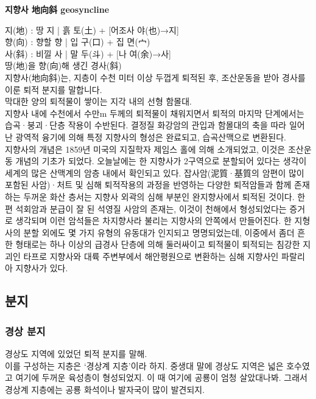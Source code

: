 \documentclass[12pt,a4paper]{book}
\begin{document}
				\textbf{지향사 地向斜 geosyncline}
				
				지(地) : 땅 지 | 흙 토(土) + [어조사 야(也)→지]\\
				향(向) : 향할 향 | 입 구(口) + 집 면(宀)\\
				사(斜) : 비낄 사 | 말 두(斗) + [나 여(余)→사]\\
				땅(地)을 향(向)해 생긴 경사(斜)\\
				지향사(地向斜)는, 
				지층이 수천 미터 이상 두껍게 퇴적된 후, 조산운동을 받아 경사를 이룬 퇴적 분지를 말합니다.\\				
막대한 양의 퇴적물이 쌓이는 지각 내의 선형 함몰대.\\
지향사 내에 수천에서 수만m 두께의 퇴적물이 채워지면서 퇴적의 마지막 단계에서는 습곡·붕괴·단층 작용이 수반된다. 결정질 화강암의 관입과 함몰대의 축을 따라 일어난 광역적 융기에 의해 특정 지향사의 형성은 완료되고, 습곡산맥으로 변환된다. \\
지향사의 개념은 1859년 미국의 지질학자 제임스 홀에 의해 소개되었고, 이것은 조산운동 개념의 기초가 되었다. 오늘날에는 한 지향사가 2구역으로 분할되어 있다는 생각이 세계의 많은 산맥계의 암층 내에서 확인되고 있다. 잡사암(泥質·基質의 암편이 많이 포함된 사암)·처트 및 심해 퇴적작용의 과정을 반영하는 다양한 퇴적암들과 함께 존재하는 두꺼운 화산 층서는 지향사 외곽의 심해 부분인 완지향사에서 퇴적된 것이다. 한편 석회암과 분급이 잘 된 석영질 사암의 존재는, 이것이 천해에서 형성되었다는 증거로 생각되며 이런 암석들은 차지향사라 불리는 지향사의 안쪽에서 만들어진다. 한 지형사의 분할 외에도 몇 가지 유형의 유동대가 인지되고 명명되었는데, 이중에서 좀더 흔한 형태로는 하나 이상의 급경사 단층에 의해 둘러싸이고 퇴적물이 퇴적되는 침강한 지괴인 타프로 지향사와 대륙 주변부에서 해안평원으로 변환하는 심해 지향사인 파랄리아 지향사가 있다.\\
				
				
		
		\subsection{분지}
		
			\subsubsection{경상 분지}
				경상도 지역에 있었던 퇴적 분지를 말해. \\
				이를 구성하는 지층은 ‘경상계 지층’이라 하지.
				중생대 말에 경상도 지역은 넓은 호수였고 여기에 두꺼운 육성층이 형성되었지.
				이 때 여기에 공룡이 엄청 살았대나봐. 
				그래서 경상계 지층에는 공룡 화석이나 발자국이 많이 발견되지.\\
				
\end{document}

